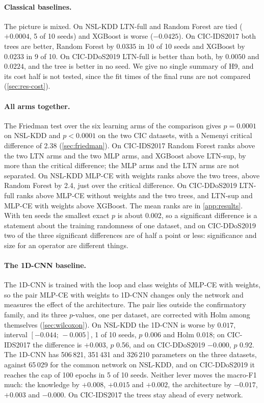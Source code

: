 \paragraph{Classical baselines.}
The picture is mixed. On NSL-KDD LTN-full and Random Forest are tied ($+0.0004$, 5 of 10 seeds) and XGBoost
is worse ($-0.0425$). On CIC-IDS2017 both trees are better, Random Forest by $0.0335$ in 10 of 10 seeds and
XGBoost by $0.0233$ in 9 of 10. On CIC-DDoS2019 LTN-full is better than both, by $0.0050$ and $0.0224$, and
the tree is better in no seed. We give no single summary of H9, and its cost half is not tested, since the fit times of the final runs are not
compared (\cref{sec:res-cost}).

\paragraph{All arms together.}
The Friedman test over the six learning arms of the comparison gives $p = 0.0001$ on NSL-KDD and
$p < 0.0001$ on the two CIC datasets, with a Nemenyi critical difference of 2.38 (\cref{sec:friedman}). On
CIC-IDS2017 Random Forest ranks above the two LTN arms and the two MLP arms, and XGBoost above LTN-sup, by
more than the critical difference; the MLP arms and the LTN arms are not separated. On NSL-KDD
MLP-CE with weights ranks above the two trees, above Random Forest by 2.4, just over the critical
difference. On CIC-DDoS2019 LTN-full ranks above MLP-CE without weights and the two trees, and LTN-sup
and MLP-CE with weights above XGBoost. The mean ranks are in
\cref{app:results}. With ten seeds the smallest exact $p$ is about 0.002, so a significant difference is a statement
about the training randomness of one dataset, and on CIC-DDoS2019 two of the three significant differences are of
half a point or less: significance and size for an operator are different things.

\paragraph{The 1D-CNN baseline.}
The 1D-CNN is trained with the loop and class weights of MLP-CE with weights, so the pair MLP-CE with weights to 1D-CNN
changes only the network and measures the effect of the architecture. The pair lies outside the confirmatory family, and
its three $p$-values, one per dataset, are corrected with Holm among themselves (\cref{sec:wilcoxon}). On NSL-KDD the
1D-CNN is worse by $0.017$, interval $[-0.044;\,-0.005]$, 1 of 10 seeds, $p$ 0.006 and Holm 0.018; on CIC-IDS2017 the
difference is $+0.003$, $p$ 0.56, and on CIC-DDoS2019 $-0.000$, $p$ 0.92. The 1D-CNN has 506\,821, 351\,431 and
326\,210 parameters on the three datasets, against 65\,029 for the common network on NSL-KDD, and on CIC-DDoS2019 it
reaches the cap of 100 epochs in 5 of 10 seeds. Neither lever moves the macro-F1 much: the knowledge by $+0.008$,
$+0.015$ and $+0.002$, the architecture by $-0.017$, $+0.003$ and $-0.000$. On CIC-IDS2017 the trees stay ahead of
every network.

